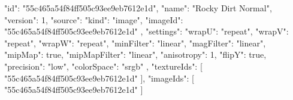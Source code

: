 {
  "id": "55c465a54f84ff505c93ee9eb7612e1d",
  "name": "Rocky Dirt Normal",
  "version": 1,
  "source": {
    "kind": "image",
    "imageId": "55c465a54f84ff505c93ee9eb7612e1d"
  },
  "settings": {
    "wrapU": "repeat",
    "wrapV": "repeat",
    "wrapW": "repeat",
    "minFilter": "linear",
    "magFilter": "linear",
    "mipMap": true,
    "mipMapFilter": "linear",
    "anisotropy": 1,
    "flipY": true,
    "precision": "low",
    "colorSpace": "srgb"
  },
  "textureIds": [
    "55c465a54f84ff505c93ee9eb7612e1d"
  ],
  "imageIds": [
    "55c465a54f84ff505c93ee9eb7612e1d"
  ]
}
